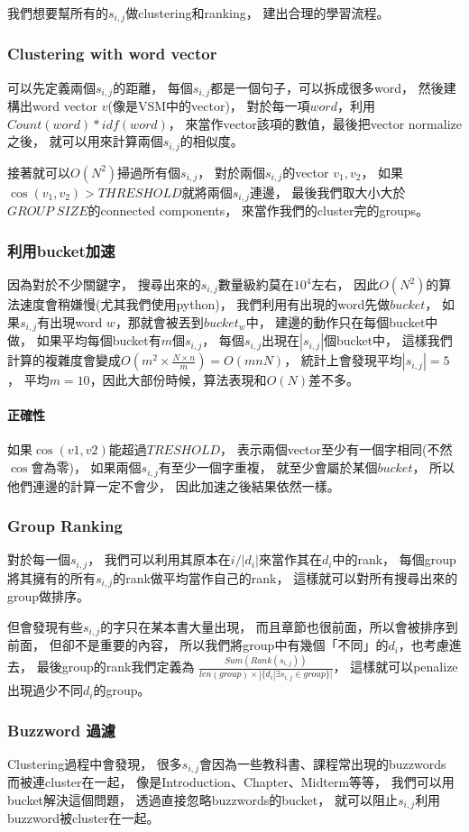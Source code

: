 我們想要幫所有的$s_{i,j}$做clustering和ranking，
建出合理的學習流程。
\subsubsection{Clustering with word vector}

可以先定義兩個$s_{i,j}$的距離，
每個$s_{i,j}$都是一個句子，可以拆成很多word，
然後建構出word vector $v$(像是VSM中的vector)，
對於每一項$word$，利用$Count(word)*idf(word)$，
來當作vector該項的數值，最後把vector normalize之後，
就可以用來計算兩個$s_{i,j}$的相似度。

接著就可以$O(N^{2})$掃過所有個$s_{i,j}$，
對於兩個$s_{i,j}$的vector $v_1,v_2$，
如果$\cos(v_1,v_2) > {THRESHOLD}$就將兩個$s_{i,j}$連邊，
最後我們取大小大於${GROUP\;SIZE}$的connected components，
來當作我們的cluster完的groups。

\subsubsection{利用bucket加速}
因為對於不少關鍵字，
搜尋出來的$s_{i,j}$數量級約莫在$10^4$左右，
因此$O(N^{2})$的算法速度會稍嫌慢(尤其我們使用python)，
我們利用有出現的word先做${bucket}$，
如果$s_{i,j}$有出現word $w$，那就會被丟到$bucket_w$中，
建邊的動作只在每個bucket中做，
如果平均每個bucket有$m$個$s_{i,j}$，
每個$s_{i,j}$出現在$|s_{i,j}|$個bucket中，
這樣我們計算的複雜度會變成$O(m^{2}\times \frac{N\times n}{m}) = O(mnN)$，
統計上會發現平均$|s_{i,j}| = 5$，
平均$m = 10$，因此大部份時候，算法表現和$O(N)$差不多。

\noindent \paragraph{正確性}
如果$\cos(v1,v2)$能超過$TRESHOLD$，
表示兩個vector至少有一個字相同(不然$\cos$會為零)，
如果兩個$s_{i,j}$有至少一個字重複，
就至少會屬於某個$bucket$，
所以他們連邊的計算一定不會少，
因此加速之後結果依然一樣。

\subsubsection{Group Ranking}
對於每一個$s_{i,j}$，
我們可以利用其原本在$i/|d_i|$來當作其在$d_i$中的rank，
每個group將其擁有的所有$s_{i,j}$的rank做平均當作自己的rank，
這樣就可以對所有搜尋出來的group做排序。

但會發現有些$s_{i,j}$的字只在某本書大量出現，
而且章節也很前面，所以會被排序到前面，
但卻不是重要的內容，
所以我們將group中有幾個「不同」的$d_i$，也考慮進去，
最後group的rank我們定義為
$\frac{Sum(Rank(s_{i,j}))}{len(group)\times |\{d_i | \exists s_{i,j} \in group\}|}$，
這樣就可以penalize出現過少不同$d_i$的group。

\subsubsection{Buzzword 過濾}
Clustering過程中會發現，
很多$s_{i,j}$會因為一些教科書、課程常出現的buzzwords
而被連cluster在一起，
像是Introduction、Chapter、Midterm等等，
我們可以用bucket解決這個問題，
透過直接忽略buzzwords的bucket，
就可以阻止$s_{i,j}$利用buzzword被cluster在一起。
